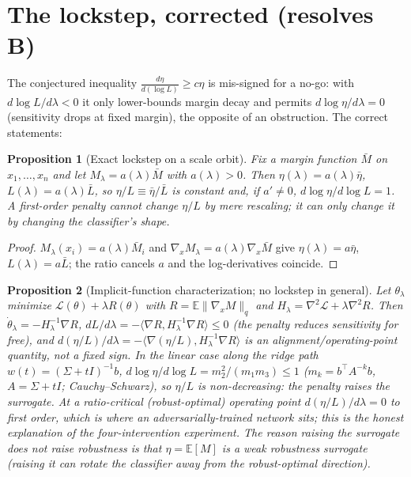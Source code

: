 \documentclass[11pt]{article}
\newtheorem{proposition}{Proposition}
\theoremstyle{definition}
\newcommand{\E}{\mathbb{E}}
\newcommand{\grad}{\nabla}
\begin{document}
\section{The lockstep, corrected (resolves B)}\label{sec:Bprime}
The conjectured inequality $\frac{d\eta}{d(\log L)}\ge c\eta$ is mis-signed for a
no-go: with $d\log L/d\lambda<0$ it only lower-bounds margin decay and permits
$d\log\eta/d\lambda=0$ (sensitivity drops at fixed margin), the opposite of an
obstruction. The correct statements:
\begin{proposition}[Exact lockstep on a scale orbit]\label{prop:Bprime}
Fix a margin function $\bar M$ on $x_1,\dots,x_n$ and let $M_\lambda=a(\lambda)\bar M$
with $a(\lambda)>0$. Then $\eta(\lambda)=a(\lambda)\bar\eta$,
$L(\lambda)=a(\lambda)\bar L$, so $\eta/L\equiv\bar\eta/\bar L$ is constant and, if
$a'\neq0$, $d\log\eta/d\log L=1$. A first-order penalty cannot change $\eta/L$ by mere
rescaling; it can only change it by changing the classifier's \emph{shape}.
\end{proposition}
\begin{proof}
$M_\lambda(x_i)=a(\lambda)\bar M_i$ and $\grad_xM_\lambda=a(\lambda)\grad_x\bar M$ give
$\eta(\lambda)=a\bar\eta$, $L(\lambda)=a\bar L$; the ratio cancels $a$ and the
log-derivatives coincide.
\end{proof}
\begin{proposition}[Implicit-function characterization; no lockstep in general]\label{prop:Bift}
Let $\theta_\lambda$ minimize $\mathcal L(\theta)+\lambda R(\theta)$ with
$R=\E\|\grad_xM\|_q$ and $H_\lambda=\grad^2\mathcal L+\lambda\grad^2R$. Then
$\dot\theta_\lambda=-H_\lambda^{-1}\grad R$, $dL/d\lambda=-\langle\grad R,H_\lambda^{-1}\grad R\rangle\le0$
(the penalty reduces sensitivity for free), and
$d(\eta/L)/d\lambda=-\langle\grad(\eta/L),H_\lambda^{-1}\grad R\rangle$ is an
alignment/operating-point quantity, not a fixed sign. In the linear case along the
ridge path $w(t)=(\Sigma+tI)^{-1}b$, $d\log\eta/d\log L=m_2^2/(m_1m_3)\le1$
($m_k=b^\top A^{-k}b$, $A=\Sigma+tI$; Cauchy--Schwarz), so $\eta/L$ is
\emph{non-decreasing}: the penalty raises the surrogate. At a ratio-critical
(robust-optimal) operating point $d(\eta/L)/d\lambda=0$ to first order, which is where
an adversarially-trained network sits; this is the honest explanation of the
four-intervention experiment. The reason raising the surrogate does not raise
robustness is that $\eta=\E[M]$ is a weak robustness surrogate (raising it can rotate
the classifier away from the robust-optimal direction).
\end{proposition}
\end{document}
